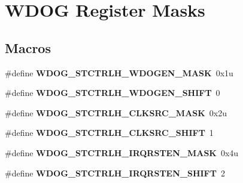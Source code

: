 \hypertarget{group__WDOG__Register__Masks}{}\section{W\+D\+OG Register Masks}
\label{group__WDOG__Register__Masks}
\subsection*{Macros}
\begin{DoxyCompactItemize}
\item 
\#define {\bfseries W\+D\+O\+G\+\_\+\+S\+T\+C\+T\+R\+L\+H\+\_\+\+W\+D\+O\+G\+E\+N\+\_\+\+M\+A\+SK}~0x1u\hypertarget{group__WDOG__Register__Masks_ga4ca33884d6a6fed2670ba04150fbff3a}{}\label{group__WDOG__Register__Masks_ga4ca33884d6a6fed2670ba04150fbff3a}

\item 
\#define {\bfseries W\+D\+O\+G\+\_\+\+S\+T\+C\+T\+R\+L\+H\+\_\+\+W\+D\+O\+G\+E\+N\+\_\+\+S\+H\+I\+FT}~0\hypertarget{group__WDOG__Register__Masks_ga7d9c369fd8fe12905d3e4b2d94bfe9be}{}\label{group__WDOG__Register__Masks_ga7d9c369fd8fe12905d3e4b2d94bfe9be}

\item 
\#define {\bfseries W\+D\+O\+G\+\_\+\+S\+T\+C\+T\+R\+L\+H\+\_\+\+C\+L\+K\+S\+R\+C\+\_\+\+M\+A\+SK}~0x2u\hypertarget{group__WDOG__Register__Masks_gaf3ab71b185905c077887baa062ad6664}{}\label{group__WDOG__Register__Masks_gaf3ab71b185905c077887baa062ad6664}

\item 
\#define {\bfseries W\+D\+O\+G\+\_\+\+S\+T\+C\+T\+R\+L\+H\+\_\+\+C\+L\+K\+S\+R\+C\+\_\+\+S\+H\+I\+FT}~1\hypertarget{group__WDOG__Register__Masks_gaa437494e2c4bb2952986b89d4a52f2bf}{}\label{group__WDOG__Register__Masks_gaa437494e2c4bb2952986b89d4a52f2bf}

\item 
\#define {\bfseries W\+D\+O\+G\+\_\+\+S\+T\+C\+T\+R\+L\+H\+\_\+\+I\+R\+Q\+R\+S\+T\+E\+N\+\_\+\+M\+A\+SK}~0x4u\hypertarget{group__WDOG__Register__Masks_ga64ebb40c66318cac7631c3fd467c846a}{}\label{group__WDOG__Register__Masks_ga64ebb40c66318cac7631c3fd467c846a}

\item 
\#define {\bfseries W\+D\+O\+G\+\_\+\+S\+T\+C\+T\+R\+L\+H\+\_\+\+I\+R\+Q\+R\+S\+T\+E\+N\+\_\+\+S\+H\+I\+FT}~2\hypertarget{group__WDOG__Register__Masks_ga0b519bf4ae17a11b51878819d4249e00}{}\label{group__WDOG__Register__Masks_ga0b519bf4ae17a11b51878819d4249e00}


\end{DoxyCompactItemize}
